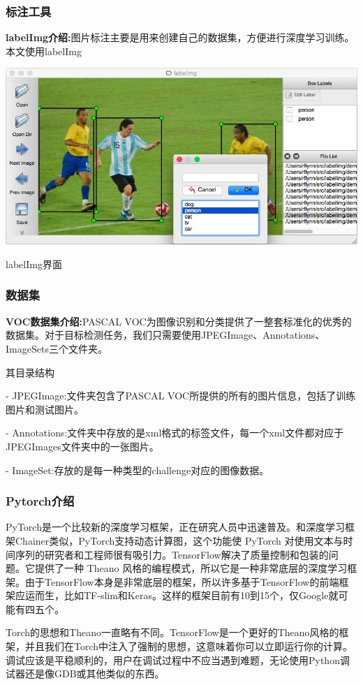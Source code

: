 \subsubsection{标注工具}
\textbf{labelImg介绍:}图片标注主要是用来创建自己的数据集，方便进行深度学习训练。本文使用labelImg
\begin{uscfigure}
	\includegraphics[width=\textwidth]{./Pictures/labelimg.jpg}	
	\caption{labelImg界面}
\end{uscfigure}
\subsubsection{数据集}
\textbf{VOC数据集介绍:}PASCAL VOC为图像识别和分类提供了一整套标准化的优秀的数据集。对于目标检测任务，我们只需要使用JPEGImage、Annotations、ImageSets三个文件夹。

其目录结构

- JPEGImage:文件夹包含了PASCAL VOC所提供的所有的图片信息，包括了训练图片和测试图片。

- Annotations:文件夹中存放的是xml格式的标签文件，每一个xml文件都对应于JPEGImages文件夹中的一张图片。

- ImageSet:存放的是每一种类型的challenge对应的图像数据。


\subsubsection{Pytorch介绍}
PyTorch是一个比较新的深度学习框架，正在研究人员中迅速普及。和深度学习框架Chainer类似，PyTorch支持动态计算图，这个功能使 PyTorch 对使用文本与时间序列的研究者和工程师很有吸引力。TensorFlow解决了质量控制和包装的问题。它提供了一种 Theano 风格的编程模式，所以它是一种非常底层的深度学习框架。由于TensorFlow本身是非常底层的框架，所以许多基于TensorFlow的前端框架应运而生，比如TF-slim和Keras。这样的框架目前有10到15个，仅Google就可能有四五个。

Torch的思想和Theano一直略有不同。TensorFlow是一个更好的Theano风格的框架，并且我们在Torch中注入了强制的思想，这意味着你可以立即运行你的计算。调试应该是平稳顺利的，用户在调试过程中不应当遇到难题，无论使用Python调试器还是像GDB或其他类似的东西。